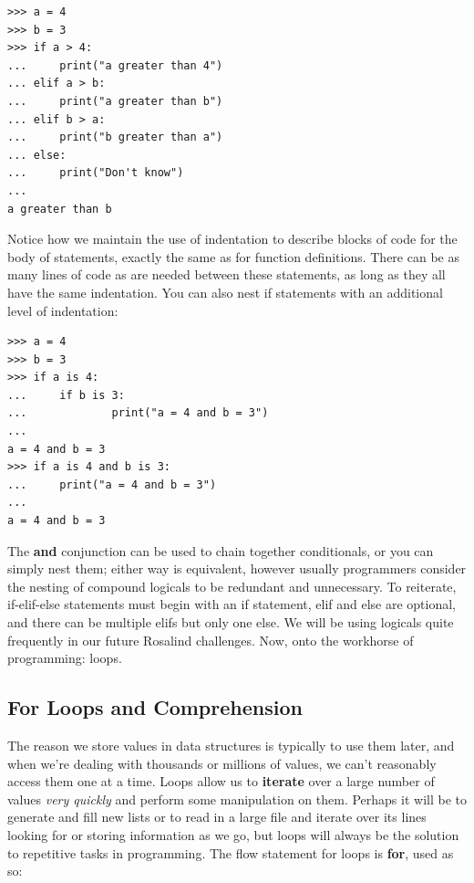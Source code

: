 \documentclass[a4paper,11pt]{article}
\begin{document}
\vspace{3mm}
\begin{lstlisting}
>>> a = 4
>>> b = 3
>>> if a > 4:
...     print("a greater than 4")
... elif a > b:
...     print("a greater than b")
... elif b > a:
...     print("b greater than a")
... else:
...     print("Don't know")
... 
a greater than b
\end{lstlisting}
\vspace{3mm}

Notice how we maintain the use of indentation to describe blocks of code for the body of statements, 
exactly the same as for function definitions.  There can be as many lines of code as are needed between 
these statements, as long as they all have the same indentation.  You can also nest if statements with 
an additional level of indentation:

\vspace{3mm}
\begin{lstlisting}
>>> a = 4
>>> b = 3
>>> if a is 4:
...     if b is 3:
...             print("a = 4 and b = 3")
... 
a = 4 and b = 3
>>> if a is 4 and b is 3:
...     print("a = 4 and b = 3")
... 
a = 4 and b = 3
\end{lstlisting}
\vspace{3mm}

The \textbf{and} conjunction can be used to chain together conditionals, or you can simply nest them; 
either way is equivalent, however usually programmers consider the nesting of compound logicals to 
be redundant and unnecessary.  To reiterate, if-elif-else statements must begin with an if statement, 
elif and else are optional, and there can be multiple elifs but only one else.  We will be using 
logicals quite frequently in our future Rosalind challenges.  Now, onto the workhorse of programming: 
loops.

\pagebreak
\subsection{For Loops and Comprehension}
The reason we store values in data structures is typically to use them later, and when we're dealing 
with thousands or millions of values, we can't reasonably access them one at a time.  Loops allow us 
to \textbf{iterate} over a large number of values \textit{very quickly} and perform some manipulation 
on them.  Perhaps it will be to generate and fill new lists or to read in a large file and iterate 
over its lines looking for or storing information as we go, but loops will always be the solution 
to repetitive tasks in programming.  The flow statement for loops is \textbf{for}, used as so:
\end{document}

